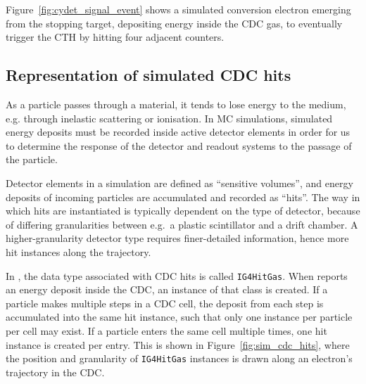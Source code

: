 Figure~\ref{fig:cydet_signal_event} shows a simulated conversion electron
emerging from the stopping target, depositing energy inside the CDC gas, to
eventually trigger the CTH by hitting four adjacent counters. 

\subsection{Representation of simulated CDC hits}
\label{subsec:SD}
As a particle passes through a material, it tends to lose energy to the medium,
e.g. through inelastic scattering or ionisation. In MC simulations, simulated
energy deposits must be recorded inside active detector elements in order for us
to determine the response of the detector and readout systems to the passage of
the particle.

Detector elements in a \Geant simulation are defined as ``sensitive volumes'',
and energy deposits of incoming particles are accumulated and recorded as
``hits''. The way in which hits are instantiated is typically dependent on the
type of detector, because of differing granularities between e.g.\ a plastic
scintillator and a drift chamber. A higher-granularity detector type requires
finer-detailed information, hence more hit instances along the trajectory.

In \SimG, the data type associated with CDC hits is called \texttt{IG4HitGas}.
When \Geant reports an energy deposit inside the CDC, an instance of that class
is created. If a particle makes multiple steps in a CDC cell, the deposit from
each step is accumulated into the same hit instance, such that only one instance
per particle per cell may exist. If a particle enters the same cell multiple
times, one hit instance is created per entry. This is shown in
Figure~\ref{fig:sim_cdc_hits}, where the position and granularity of
\texttt{IG4HitGas} instances is drawn along an electron's trajectory in the CDC.




